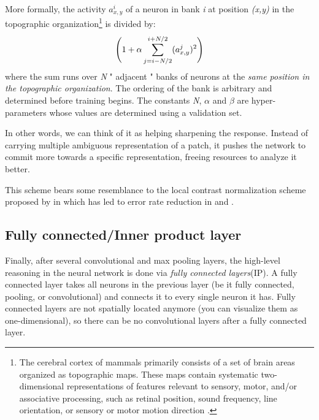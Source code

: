 More formally, the activity $a_{x,y}^{i}$ of a neuron in bank \textit{i} at position \textit{(x,y)} in the topographic organization\footnote{The cerebral cortex of mammals primarily consists of a set of brain areas organized as topographic maps. These maps contain systematic two-dimensional representations of features relevant to sensory, motor, and/or associative processing, such as retinal position, sound frequency, line orientation, or sensory or motor motion direction \cite{patel2014topographic}.} is divided by:
\begin{equation}
\centering
\Bigg( 1+ \alpha \sum_{j=i-N/2}^{i+N/2} (a_{x,y}^{j})^{2} \Bigg)
\end{equation}
where the sum runs over \textit{N} " adjacent " banks of neurons at the \textit{same position in the topographic organization}. The ordering of the bank is arbitrary and determined before training begins. The constants \textit{N}, $\alpha$ and $\beta$ are hyper-parameters whose values are determined using a validation set.

In other words, we can think of it as helping sharpening the response. Instead of carrying multiple ambiguous representation of a patch, it pushes the network to commit more towards a specific representation, freeing resources to analyze it better.

\indent This scheme bears some resemblance to the local contrast normalization scheme proposed by \citeauthor{jarrett2009best} in \cite{jarrett2009best} which has led to error rate reduction in \cite{krizhevsky2012imagenet} and \cite{hinton2012improving}. 

\subsection{Fully connected/Inner product layer}

Finally, after several convolutional and max pooling layers, the high-level reasoning in the neural network is done via \textit{fully connected layers}(IP). A fully connected layer takes all neurons in the previous layer (be it fully connected, pooling, or convolutional) and connects it to every single neuron it has. Fully connected layers are not spatially located anymore (you can visualize them as one-dimensional), so there can be no convolutional layers after a fully connected layer. 




